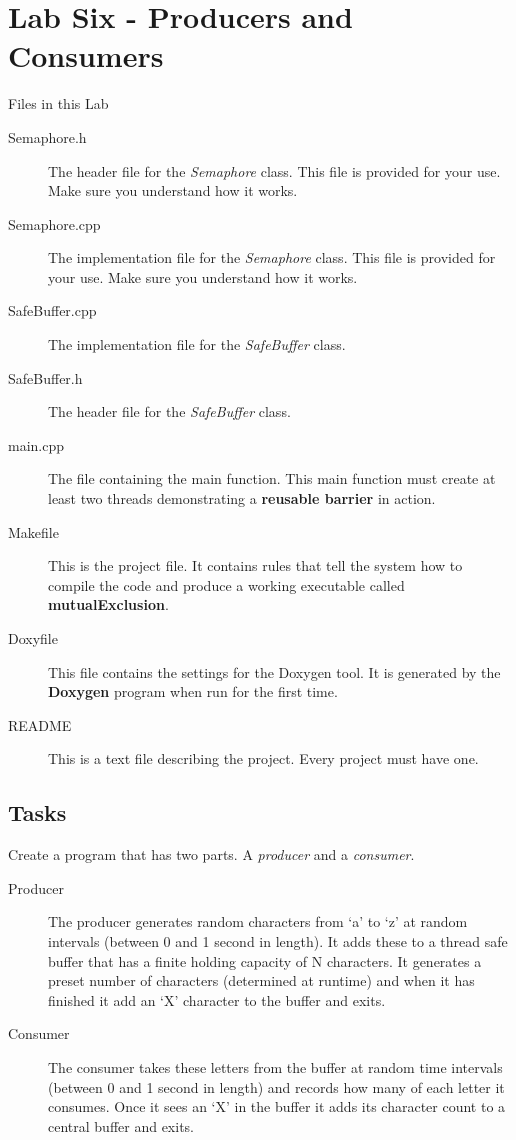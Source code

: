 \documentclass[10pt,a4paper]{article}
\begin{document}
 \section{Lab Six - Producers and Consumers}
 Files in this Lab
 \begin{description}
\item[Semaphore.h] The header file for the \textit{Semaphore} class.  This file is provided for your use.  Make sure you understand how it works.
\item[Semaphore.cpp] The implementation file for the \textit{Semaphore} class.  This file is provided for your use.  Make sure you understand how it works.
    \item[SafeBuffer.cpp] The implementation file for the \textit{SafeBuffer} class.  
    \item[SafeBuffer.h] The header file for the \textit{SafeBuffer} class.
\item[main.cpp] The file containing the main function.  This main function must create at least two threads demonstrating a \textbf{reusable barrier} in action.  
\item[Makefile] This is the project file. It contains rules that tell the system how to compile the code and produce a working executable called \textbf{mutualExclusion}. 
\item[Doxyfile] This file contains the settings for the Doxygen tool. It is generated by the \textbf{Doxygen} program when run for the first time.
\item[README] This is a text file describing the project. Every project must have one.
\end{description}
 \subsection{Tasks}
 Create a program that has two parts.  A \textit{producer} and a \textit{consumer}.
\begin{description}
\item[Producer] The producer generates random characters from ‘a’ to ‘z’ at random intervals (between 0 and 1 second in length). It adds these to a thread safe buffer that has a finite holding capacity of N characters. It generates a preset number of characters (determined at runtime) and when it has finished it add an ‘X’ character to the buffer and exits.

\item[Consumer] The consumer takes these letters from the buffer at random time intervals (between 0 and 1 second in length) and records how many of each letter it consumes. Once it sees an ‘X’ in the buffer it adds its character count to a central buffer and exits.
\end{description}
\end{document}
